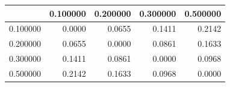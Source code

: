 \begin{tabular}{lrrrr}
\toprule
 & 0.100000 & 0.200000 & 0.300000 & 0.500000 \\
\midrule
0.100000 & 0.0000 & 0.0655 & 0.1411 & 0.2142 \\
0.200000 & 0.0655 & 0.0000 & 0.0861 & 0.1633 \\
0.300000 & 0.1411 & 0.0861 & 0.0000 & 0.0968 \\
0.500000 & 0.2142 & 0.1633 & 0.0968 & 0.0000 \\
\bottomrule
\end{tabular}
